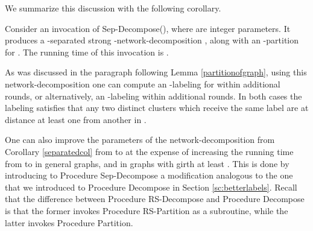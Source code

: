 \documentclass[11pt]{article}
\begin{document}
We summarize this discussion with the following corollary.
\begin{col} \label{separatedcol}
Consider an invocation of Sep-Decompose(), where  are integer parameters. It produces a -separated strong -network-decomposition , along with an -partition  for . The running time of this invocation is .
\end{col}
As was discussed in the paragraph following Lemma \ref{partitionofgraph}, using this network-decomposition one can compute an -labeling for  within additional  rounds, or alternatively, an -labeling within additional  rounds. In both cases the labeling satisfies that any two distinct clusters  which receive the same label are at distance at least  one from another in .

































One can also improve the parameters of the network-decomposition from Corollary \ref{separatedcol} from  to  at the expense of increasing the running time from  to  in general graphs, and  in graphs with girth at least . This is done by introducing to Procedure Sep-Decompose a modification analogous to the one that we introduced to Procedure Decompose in Section \ref{sc:betterlabels}.
Recall that the difference between Procedure RS-Decompose and Procedure Decompose is that the former invokes Procedure RS-Partition as a subroutine, while the latter invokes Procedure Partition.
\end{document}
